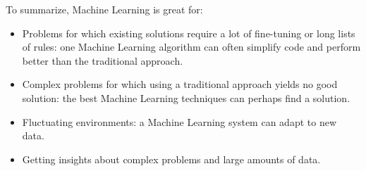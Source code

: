 To summarize, Machine Learning is great for:
\begin{itemize}
\item Problems for which existing solutions require a lot of fine-tuning or long lists of
rules: one Machine Learning algorithm can often simplify code and perform better than the traditional approach.
\item
 Complex problems for which using a traditional approach yields no good solution: the best Machine Learning techniques can perhaps find a solution.
\item
 Fluctuating environments: a Machine Learning system can adapt to new data.
\item
 Getting insights about complex problems and large amounts of data.
\end{itemize}

